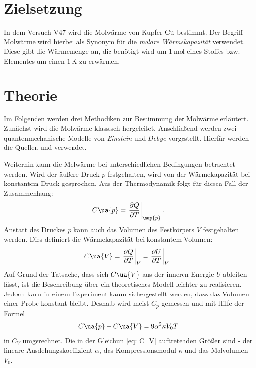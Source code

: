 \setcounter{page}{1}
\section*{Zielsetzung}
In dem Versuch V47 wird die Molwärme von Kupfer $\ce{Cu}$ bestimmt.
Der Begriff Molwärme wird hierbei als Synonym für die \emph{molare Wärmekapazität} verwendet.
Diese gibt die Wärmemenge an, die benötigt wird um $\SI{1}{\mol}$ eines Stoffes
bzw. Elementes um einen $\SI{1}{\kelvin}$ zu erwärmen.

\section{Theorie}\label{sec:theorie}
Im Folgenden werden drei Methodiken zur Bestimmung der Molwärme erläutert.
Zunächst wird die Molwärme klassisch hergeleitet. Anschließend werden zwei
quantenmechanische Modelle von \emph{Einstein} und \emph{Debye}
vorgestellt. Hierfür werden die Quellen \cite{anleitungV47} und \cite[S. 215]{marx} verwendet.

Weiterhin kann die Molwärme bei unterschiedlichen Bedingungen betrachtet werden.
Wird der äußere Druck $p$ festgehalten, wird von der Wärmekapazität bei konstantem
Druck gesprochen. Aus der Thermodynamik folgt für diesen Fall der Zusammenhang:
\begin{equation}
  \label{eq:C_P}
  C\ua{p} = \left.\frac{\partial Q}{\partial T}\right|_{\map{p}}.
\end{equation}
Anstatt des Druckes $p$ kann auch das Volumen des Festkörpers $V$ festgehalten
werden. Dies definiert die Wärmekapazität bei konstantem Volumen:
\begin{equation}
  \label{eq:C_V}
  C\ua{V} = \left.\frac{\partial Q}{\partial T}\right|_{V} = \left. \frac{\partial U}{\partial T}\right|_{V}.
\end{equation}
Auf Grund der Tatsache, dass sich $C\ua{V}$ aus der inneren Energie $U$ ableiten
lässt, ist die Beschreibung über ein theoretisches Modell leichter zu realisieren.
Jedoch kann in einem Experiment kaum sichergestellt werden, dass das Volumen einer
Probe konstant bleibt. Deshalb wird meist $C_p$ gemessen und mit Hilfe
der Formel
\begin{equation}
  \label{eq: C_V}
  C\ua{p} - C\ua{V} = 9\alpha^2 \kappa V_0 T
\end{equation}
in $C_V$ umgerechnet. Die in der Gleichun \eqref{eq: C_V} auftretenden
Größen sind - der lineare Ausdehungskoeffizient $\alpha$, das Kompressionsmodul
$\kappa$ und das Molvolumen $V_0$.
